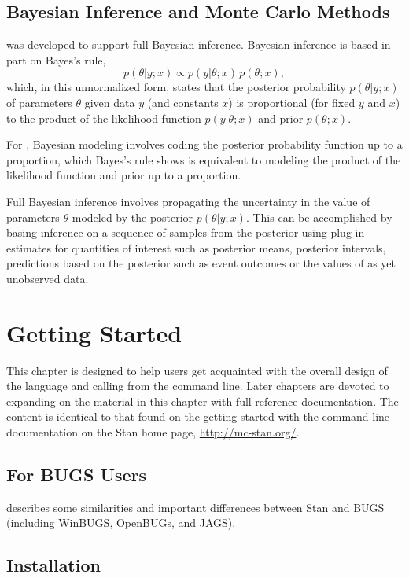 \section{Bayesian Inference and Monte Carlo Methods}

\Stan was developed to support full Bayesian inference.  Bayesian
inference is based in part on Bayes's rule,
\[
p(\theta|y;x) \propto p(y|\theta;x) \, p(\theta;x),
\]
which, in this unnormalized form, states that the posterior
probability $p(\theta|y;x)$ of parameters $\theta$ given data $y$ (and
constants $x$) is proportional (for fixed $y$ and $x$) to the
product of the likelihood function $p(y|\theta;x)$ and prior
$p(\theta;x)$.

For \Stan, Bayesian modeling involves coding the posterior probability
function up to a proportion, which Bayes's rule shows is equivalent to
modeling the product of the likelihood function and prior up to a
proportion.

Full Bayesian inference involves propagating the uncertainty in the
value of parameters $\theta$ modeled by the posterior $p(\theta|y;x)$.
This can be accomplished by basing inference on a sequence of samples
from the posterior using plug-in estimates for quantities of interest
such as posterior means, posterior intervals, predictions based on the
posterior such as event outcomes or the values of as yet unobserved
data.



\chapter{Getting Started}

\noindent
This chapter is designed to help users get acquainted with the overall
design of the \Stan language and calling \Stan from the command line.
Later chapters are devoted to expanding on the material in this
chapter with full reference documentation.  The content is identical
to that found on the getting-started with the command-line
documentation on the Stan home page, \url{http://mc-stan.org/}.

\section{For BUGS Users}

 describes some similarities
and important differences between Stan and BUGS (including WinBUGS,
OpenBUGs, and JAGS).


\section{Installation}

